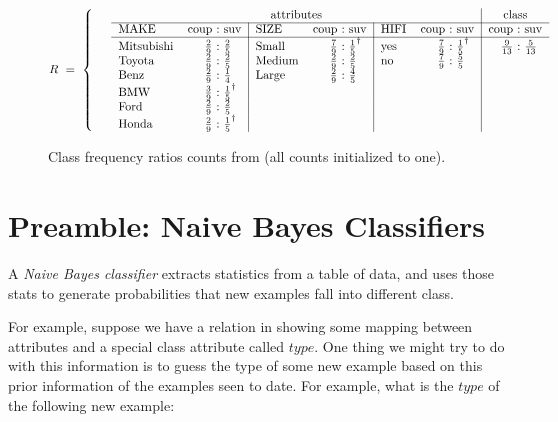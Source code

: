 \begin{figure*}
\begin{footnotesize}\[
R~=~\left\{~\begin{tabular}{rlr@{~:~}l|lr@{~:~}l|lr@{~:~}l|r@{~:~}l}
 \multicolumn{1}{l}{}&\multicolumn{9}{c|}{attributes}& \multicolumn{2}{c}{class}\\\cline{2-12}
\multicolumn{1}{c}{}&    MAKE&       coup& suv     & SIZE &coup&suv
&HIFI & coup&suv    & coup&suv\\\cline{2-12}
&Mitsubishi& $\frac{2}{9}$& $\frac{2}{5}$   & Small  &  $\frac{7}{9}$&$\frac{1}{5}^\dag$&yes &$\frac{7}{9}$&$\frac{1}{5}^\dag$  &  $\frac{9}{13}$& $\frac{5}{13}$\\
&Toyota    & $\frac{2}{9}$& $\frac{2}{5}$   & Medium &  $\frac{2}{9}$&$\frac{2}{5}$     &  no &$\frac{7}{9}$&$\frac{5}{5}$&\multicolumn{2}{l}{}\\
&Benz      & $\frac{2}{9}$& $\frac{1}{4}$   & Large   & $\frac{2}{9}$&$\frac{4}{5}$&\multicolumn{3}{l|}{}&\multicolumn{2}{l}{}\\
&BMW       & $\frac{3}{9}$&$\frac{1}{5}^\dag$&\multicolumn{3}{l|}{}&\multicolumn{3}{l|}{}&\multicolumn{2}{l}{}\\
&Ford      & $\frac{2}{9}$& $\frac{2}{5}$&\multicolumn{3}{l|}{}&\multicolumn{3}{l|}{}&\multicolumn{2}{l}{}\\
&Honda     &
$\frac{2}{9}$&$\frac{1}{5}^\dag$&\multicolumn{3}{l|}{}&\multicolumn{3}{l|}{}&\multicolumn{2}{l}{}\\
\end{tabular}
\right. \]
\end{footnotesize}
\caption{Class frequency ratios counts from \protect{} (all
counts initialized to one).}\label{fig:counts}
\end{figure*}
\section{Preamble: Naive Bayes Classifiers}
 A {\em Naive Bayes classifier} extracts statistics
 from a table of data, and uses those stats to generate
 probabilities that new examples fall into different class.

For example, suppose we have a relation in  showing some
mapping between attributes and a special class attribute called
$type$. One thing we might try to do with this information is to
guess the type of some new example based on this prior information of
the examples seen to date. For example, what is the $type$ of the
following new example:

